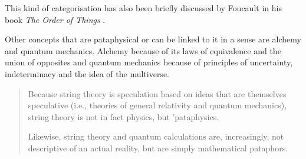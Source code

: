 This kind of categorisation has also been briefly discussed by Foucault in his book \textit{The Order of Things} \autocite*{Foucault1966}.

\spirals

Other concepts that are pataphysical or can be linked to it in a sense are alchemy and quantum mechanics. Alchemy because of its laws of equivalence and the union of opposites \autocite{Hugill2012} and quantum mechanics because of principles of uncertainty, indeterminacy and the idea of the multiverse.

\begin{quotation}
  Because string theory is speculation based on ideas that are themselves speculative (i.e., theories of general relativity and quantum mechanics), string theory is not in fact physics, but 'pataphysics.

  Likewise, string theory and quantum calculations are, increasingly, not descriptive of an actual reality, but are simply mathematical pataphors. 
\end{quotation}

\stopcontents[chapters]
